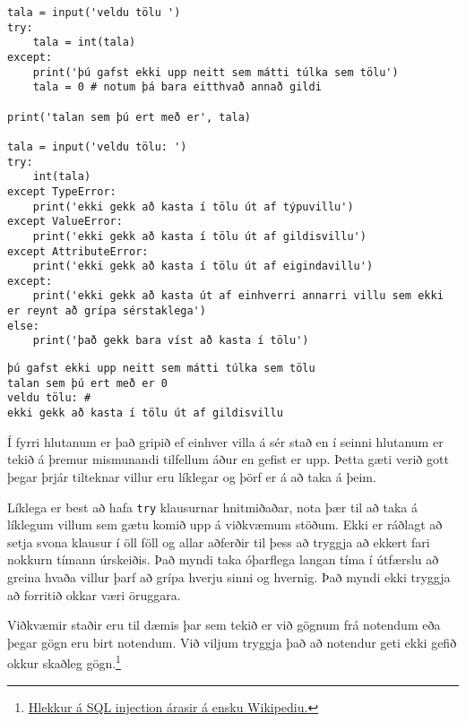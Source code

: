 \begin{lstlisting}[caption=Hvernig á að beita try\, except og else, label=lst:villur-grip-kynnt]
tala = input('veldu tölu ')
try:
	tala = int(tala)
except:
	print('þú gafst ekki upp neitt sem mátti túlka sem tölu')
	tala = 0 # notum þá bara eitthvað annað gildi
	
print('talan sem þú ert með er', tala)

tala = input('veldu tölu: ')
try:
	int(tala)
except TypeError:
	print('ekki gekk að kasta í tölu út af týpuvillu')
except ValueError:
	print('ekki gekk að kasta í tölu út af gildisvillu')
except AttributeError:
	print('ekki gekk að kasta í tölu út af eigindavillu')
except:
	print('ekki gekk að kasta út af einhverri annarri villu sem ekki er reynt að grípa sérstaklega')
else:
	print('það gekk bara víst að kasta í tölu')
\end{lstlisting}
\lstset{style=uttak}
\begin{lstlisting}
þú gafst ekki upp neitt sem mátti túlka sem tölu
talan sem þú ert með er 0
veldu tölu: #
ekki gekk að kasta í tölu út af gildisvillu
\end{lstlisting}
\lstset{style=venjulegt}

Í fyrri hlutanum er það gripið ef einhver villa á sér stað en í seinni hlutanum er tekið á þremur mismunandi tilfellum áður en gefist er upp.
Þetta gæti verið gott þegar þrjár tilteknar villur eru líklegar og þörf er á að taka á þeim.

Líklega er best að hafa \texttt{try} klausurnar hnitmiðaðar, nota þær til að taka á líklegum villum sem gætu komið upp á viðkvæmum stöðum.
Ekki er ráðlagt að setja svona klausur í öll föll og allar aðferðir til þess að tryggja að ekkert fari nokkurn tímann úrskeiðis.
Það myndi taka óþarflega langan tíma í útfærslu að greina hvaða villur þarf að grípa hverju sinni og hvernig.
Það myndi ekki tryggja að forritið okkar væri öruggara.

Viðkvæmir staðir eru til dæmis þar sem tekið er við gögnum frá notendum eða þegar gögn eru birt notendum.
Við viljum tryggja það að notendur geti ekki gefið okkur skaðleg gögn.\footnote{\href{https://en.wikipedia.org/wiki/SQL_injection}{Hlekkur á SQL injection árasir á ensku Wikipediu.}}

